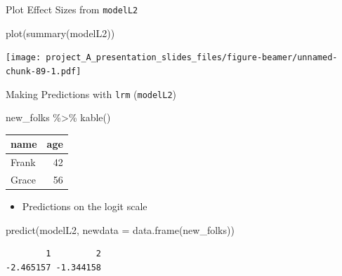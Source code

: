 \documentclass[
  ignorenonframetext,
]{beamer}
\newenvironment{Shaded}{\begin{snugshade}}{\end{snugshade}}
\newcommand{\AttributeTok}[1]{\textcolor[rgb]{0.77,0.63,0.00}{#1}}
\newcommand{\FunctionTok}[1]{\textcolor[rgb]{0.00,0.00,0.00}{#1}}
\newcommand{\NormalTok}[1]{#1}
\newcommand{\SpecialCharTok}[1]{\textcolor[rgb]{0.00,0.00,0.00}{#1}}
\providecommand{\tightlist}{%
  \setlength{\itemsep}{0pt}\setlength{\parskip}{0pt}}
\begin{document}
\begin{frame}[fragile]{Plot Effect Sizes from \texttt{modelL2}}
\protect\hypertarget{plot-effect-sizes-from-modell2}{}
\begin{Shaded}
\begin{Highlighting}[]
\FunctionTok{plot}\NormalTok{(}\FunctionTok{summary}\NormalTok{(modelL2))}
\end{Highlighting}
\end{Shaded}

\texttt{[image: project\_A\_presentation\_slides\_files/figure-beamer/unnamed-chunk-89-1.pdf]}
\end{frame}

\begin{frame}[fragile]{Making Predictions with \texttt{lrm}
(\texttt{modelL2})}
\protect\hypertarget{making-predictions-with-lrm-modell2}{}
\begin{Shaded}
\begin{Highlighting}[]
\NormalTok{new\_folks }\SpecialCharTok{\%\textgreater{}\%} \FunctionTok{kable}\NormalTok{()}
\end{Highlighting}
\end{Shaded}

\begin{longtable}[]{@{}lr@{}}
\toprule
name & age \\
\midrule
\endhead
Frank & 42 \\
Grace & 56 \\
\bottomrule
\end{longtable}

\begin{itemize}
\tightlist
\item
  Predictions on the logit scale
\end{itemize}

\begin{Shaded}
\begin{Highlighting}[]
\FunctionTok{predict}\NormalTok{(modelL2, }\AttributeTok{newdata =} \FunctionTok{data.frame}\NormalTok{(new\_folks))}
\end{Highlighting}
\end{Shaded}

\begin{verbatim}
        1         2 
-2.465157 -1.344158 
\end{verbatim}
\end{frame}
\end{document}
